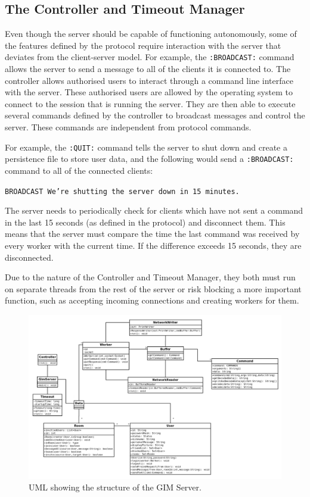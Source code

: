 \subsection{The Controller and Timeout Manager}
Even though the server should be capable of functioning autonomously, some of the features defined by the protocol require interaction with the server that deviates from the client-server model. For example, the \texttt{:BROADCAST:} command allows the server to send a message to all of the clients it is connected to. The controller allows authorised users to interact through a command line interface with the server. These authorised users are allowed by the operating system to connect to the session that is running the server. They are then able to execute several commands defined by the controller to broadcast messages and control the server. These commands are independent from protocol commands.

For example, the \texttt{:QUIT:} command tells the server to shut down and create a persistence file to store user data, and the following would send a \texttt{:BROADCAST:} command to all of the connected clients:

\texttt{BROADCAST We're shutting the server down in 15 minutes.}

The server needs to periodically check for clients which have not sent a command in the last 15 seconds (as defined in the protocol) and disconnect them. This means that the server must compare the time the last command was received by every worker with the current time. If the difference exceeds 15 seconds, they are disconnected.

Due to the nature of the Controller and Timeout Manager, they both must run on separate threads from the rest of the server or risk blocking a more important function, such as accepting incoming connections and creating workers for them.

\begin{landscape}
    \begin{figure}
        \begin{center}
            \includegraphics[scale=0.5]{Design/diagrams/server_uml.png}
            \caption{UML showing the structure of the GIM Server.}
            \label{umlDia}
        \end{center}
    \end{figure}
\end{landscape}
